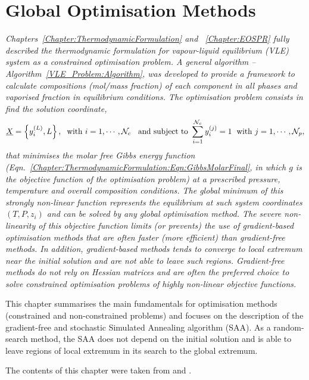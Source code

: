 
\chapter{Global Optimisation Methods}\label{Chapter:GlobalOpt}

\begin{adjustwidth}{1cm}{1cm}
    {\it Chapters~\ref{Chapter:ThermodynamicFormulation} and ~\ref{Chapter:EOSPR} fully described the thermodynamic formulation for vapour-liquid equilibrium (VLE) system as a constrained optimisation problem. A general algorithm -- Algorithm~\ref{VLE_Problem:Algorithm}, was developed to provide a framework to calculate compositions (mol/mass fraction) of each component in all phases and vaporised fraction in equilibrium conditions. The optimisation problem consists in find the solution coordinate,
\begin{displaymath}
   \underline{X} = \left\{\mfr[y]{i}{L}, L\right\},\;\text{ with } i=1,\cdots,\mathcal{N}_{c}\;\;\text{ and subject to } \summation_{i=1}^{\mathcal{N}_{c}}\mfr[y]{i}{j}=1\;\text{ with }j=1,\cdots,\mathcal{N}_{p},
\end{displaymath}
that minimises the molar free Gibbs energy function (\ie Eqn.~\ref{Chapter:ThermodynamicFormulation:Eqn:GibbsMolarFinal}, in which $g$ is the objective function of the optimisation problem) at a prescribed pressure, temperature and overall composition conditions. The global minimum of this strongly non-linear function represents the equilibrium at such system coordinates $\left(T, P, z_{i}\right)$ and can be solved by any global optimisation method. The severe non-linearity of this objective function limits (or prevents) the use of gradient-based optimisation methods that are often faster (\ie more efficient) than gradient-free methods. In addition, gradient-based methods tends to converge to local extremum near the initial solution and are not able to leave such regions. Gradient-free methods do not rely on Hessian matrices and are often the preferred choice to solve constrained optimisation problems of highly non-linear objective functions.  

This chapter summarises the main fundamentals for optimisation methods (constrained and non-constrained problems) and focuses on the description of the gradient-free and stochastic Simulated Annealing algorithm (SAA). As a random-search method, the SAA does not depend on the initial solution and is able to leave regions of local extremum in its search to the global extremum.

\medskip

The contents of this chapter were taken from \citet{Gomes_MSc_1999} and \citet{Jamil_2013} \citep[see also][]{gomes_2001,Kramer_BookChapter_2011,Rios_2013,Hicken_LectNote1,Hicken_LectNote2,Hicken_LectNote3}.
}
\end{adjustwidth}


